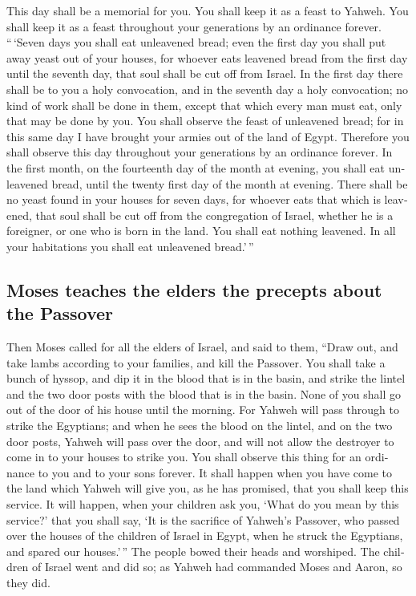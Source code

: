 \begin{paracol}{2}
\begin{otherlanguage}{english}
 This day shall be a memorial for you. You shall keep it
as a feast to Yahweh. You shall keep it as a feast throughout your
generations by an ordinance forever.  ``\,`Seven days you
shall eat unleavened bread; even the first day you shall put away yeast
out of your houses, for whoever eats leavened bread from the first day
until the seventh day, that soul shall be cut off from Israel.
 In the first day there shall be to you a holy
convocation, and in the seventh day a holy convocation; no kind of work
shall be done in them, except that which every man must eat, only that
may be done by you.  You shall observe the feast of
unleavened bread; for in this same day I have brought your armies out of
the land of Egypt. Therefore you shall observe this day throughout your
generations by an ordinance forever.  In the first month,
on the fourteenth day of the month at evening, you shall eat unleavened
bread, until the twenty first day of the month at evening.
 There shall be no yeast found in your houses for seven
days, for whoever eats that which is leavened, that soul shall be cut
off from the congregation of Israel, whether he is a foreigner, or one
who is born in the land.  You shall eat nothing leavened.
In all your habitations you shall eat unleavened bread.'\,''

\hypertarget{moses-teaches-the-elders-the-precepts-about-the-passover}{%
\subsection{Moses teaches the elders the precepts about the
Passover}\label{moses-teaches-the-elders-the-precepts-about-the-passover}}

 Then Moses called for all the elders of Israel, and said
to them, ``Draw out, and take lambs according to your families, and kill
the Passover.  You shall take a bunch of hyssop, and dip
it in the blood that is in the basin, and strike the lintel and the two
door posts with the blood that is in the basin. None of you shall go out
of the door of his house until the morning.  For Yahweh
will pass through to strike the Egyptians; and when he sees the blood on
the lintel, and on the two door posts, Yahweh will pass over the door,
and will not allow the destroyer to come in to your houses to strike
you.  You shall observe this thing for an ordinance to
you and to your sons forever.  It shall happen when you
have come to the land which Yahweh will give you, as he has promised,
that you shall keep this service.  It will happen, when
your children ask you, `What do you mean by this service?'
 that you shall say, `It is the sacrifice of Yahweh's
Passover, who passed over the houses of the children of Israel in Egypt,
when he struck the Egyptians, and spared our houses.'\,'' The people
bowed their heads and worshiped.  The children of Israel
went and did so; as Yahweh had commanded Moses and Aaron, so they did.


\end{otherlanguage}
\end{paracol}
